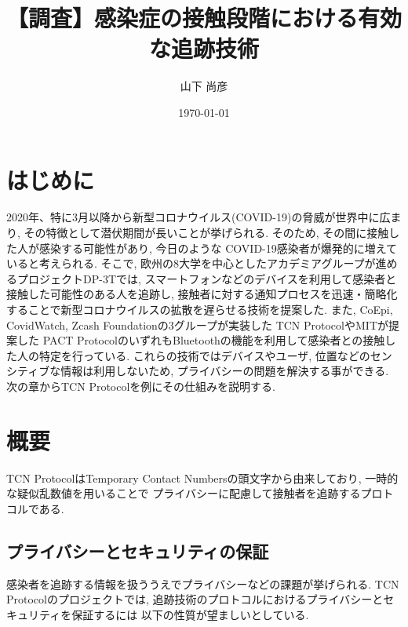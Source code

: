 \documentclass[twocolumn,10pt]{ltjsarticle}
\title{【調査】感染症の接触段階における有効な追跡技術}
\author{山下 尚彦}
\date{\today}
\begin{document}
\maketitle

\section{はじめに}
2020年、特に3月以降から新型コロナウイルス(COVID-19)の脅威が世界中に広まり\cite{外務省2020感染状況}, 
その特徴として潜伏期間が長いことが挙げられる. そのため, その間に接触した人が感染する可能性があり, 今日のような
COVID-19感染者が爆発的に増えていると考えられる. 
そこで, 欧州の8大学を中心としたアカデミアグループが進めるプロジェクトDP-3T\cite{GitHub2020DP3Tdoc}では, 
スマートフォンなどのデバイスを利用して感染者と接触した可能性のある人を追跡し, 
接触者に対する通知プロセスを迅速・簡略化することで新型コロナウイルスの拡散を遅らせる技術を提案した. 
また, CoEpi, CovidWatch, Zcash Foundationの3グループが実装した
TCN Protocol\cite{GitHub2020TCNProtocol}やMITが提案した
PACT Protocol\cite{Ronald2020PACT}のいずれもBluetoothの機能を利用して感染者との接触した人の特定を行っている. 
これらの技術ではデバイスやユーザ, 位置などのセンシティブな情報は利用しないため, プライバシーの問題を解決する事ができる. 
次の章からTCN Protocolを例にその仕組みを説明する. 

\section{概要}
TCN ProtocolはTemporary Contact Numbersの頭文字から由来しており, 一時的な疑似乱数値を用いることで
プライバシーに配慮して接触者を追跡するプロトコルである. 

\subsection{プライバシーとセキュリティの保証}
感染者を追跡する情報を扱ううえでプライバシーなどの課題が挙げられる. 
TCN Protocolのプロジェクトでは, 追跡技術のプロトコルにおけるプライバシーとセキュリティを保証するには
以下の性質が望ましいとしている. 
\end{document}
